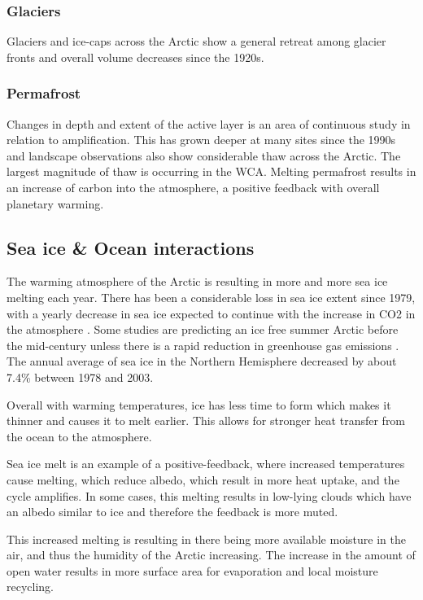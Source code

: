 \documentclass[11pt, oneside]{article}
\begin{document}
\subsubsection{Glaciers}
Glaciers and ice-caps across the Arctic show a general retreat among glacier fronts and overall volume decreases since the 1920s.

\subsubsection{Permafrost}
Changes in depth and extent of the active layer is an area of continuous study in relation to amplification. This has grown deeper at many sites since the 1990s and landscape observations also show considerable thaw across the Arctic. The largest magnitude of thaw is occurring in the WCA. Melting permafrost results in an increase of carbon into the atmosphere, a positive feedback with overall planetary warming.  


\subsection{Sea ice \& Ocean interactions}
The warming atmosphere of the Arctic is resulting in more and more sea ice melting each year. There has been a considerable loss in sea ice extent since 1979, with a yearly decrease in sea ice expected to continue with the increase in CO2 in the atmosphere \cite{dai2019arctic}. Some studies are predicting an ice free summer Arctic before the mid-century unless there is a rapid reduction in greenhouse gas emissions \cite{notz2018trajectory}. The annual average of sea ice in the Northern Hemisphere decreased by about 7.4\% between 1978 and 2003. 



Overall with warming temperatures, ice has less time to form which makes it thinner and causes it to melt earlier. This allows for stronger heat transfer from the ocean to the atmosphere. 

Sea ice melt is an example of a positive-feedback, where increased temperatures cause melting, which reduce albedo, which result in more heat uptake, and the cycle amplifies. In some cases, this melting results in low-lying clouds which have an albedo similar to ice and therefore the feedback is more muted. 

This increased melting is resulting in there being more available moisture in the air, and thus the humidity of the Arctic increasing. The increase in the amount of open water results in more surface area for evaporation and local moisture recycling. 
\end{document}
